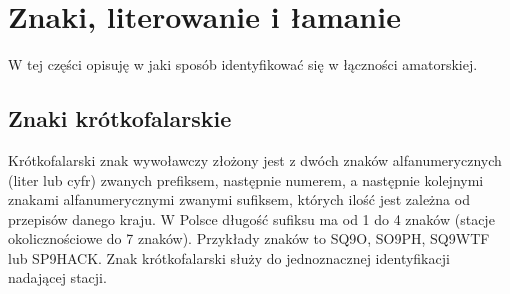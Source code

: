 \documentclass[a4paper,11pt]{article}
\begin{document}
\section{Znaki, literowanie i łamanie}
W tej części opisuję w jaki sposób identyfikować się w łączności amatorskiej.
\subsection{Znaki krótkofalarskie}
Krótkofalarski znak wywoławczy złożony jest z dwóch znaków alfanumerycznych (liter lub cyfr) zwanych prefiksem, następnie numerem, a następnie kolejnymi znakami alfanumerycznymi zwanymi sufiksem, których ilość jest zależna od przepisów danego kraju. W Polsce długość sufiksu ma od 1 do 4 znaków (stacje okolicznościowe do 7 znaków). Przykłady znaków to SQ9O, SO9PH, SQ9WTF lub SP9HACK. Znak krótkofalarski służy do jednoznacznej identyfikacji nadającej stacji.
\end{document}
